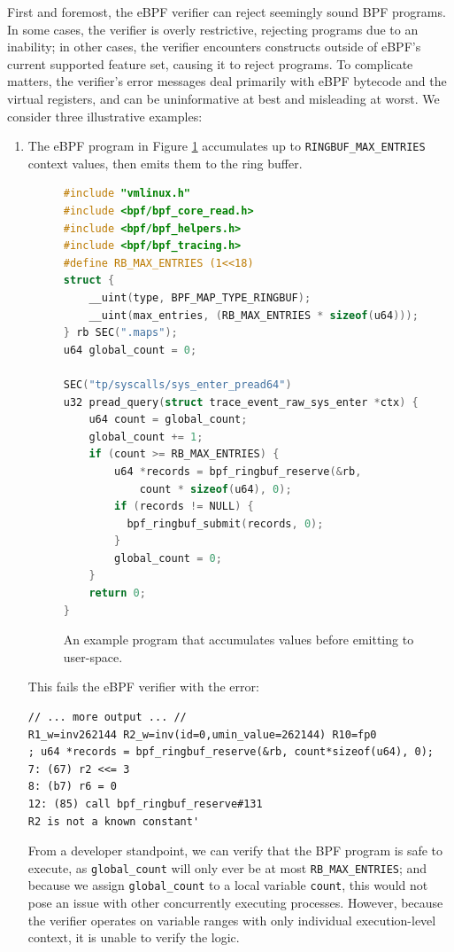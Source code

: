 First and foremost, the eBPF verifier can reject seemingly sound BPF programs. In some cases, the
verifier is overly restrictive, rejecting programs due to an inability; in other cases, the verifier
encounters constructs outside of eBPF's current supported feature set, causing it to reject
programs. To complicate matters, the verifier's error messages deal primarily with eBPF bytecode and
the virtual registers, and can be uninformative at best and misleading at worst. We consider three
illustrative examples:

\begin{enumerate}
    \item The eBPF program in Figure \ref{code:fail-1} accumulates up to
        \texttt{RINGBUF\_MAX\_ENTRIES} context values, then emits them to the ring buffer.
\begin{figure}[htpb]
\begin{lstlisting}[language=C]
#include "vmlinux.h"
#include <bpf/bpf_core_read.h>
#include <bpf/bpf_helpers.h>
#include <bpf/bpf_tracing.h>
#define RB_MAX_ENTRIES (1<<18)
struct {
    __uint(type, BPF_MAP_TYPE_RINGBUF);
    __uint(max_entries, (RB_MAX_ENTRIES * sizeof(u64)));
} rb SEC(".maps");
u64 global_count = 0;

SEC("tp/syscalls/sys_enter_pread64")
u32 pread_query(struct trace_event_raw_sys_enter *ctx) {
    u64 count = global_count;
    global_count += 1;
    if (count >= RB_MAX_ENTRIES) {
        u64 *records = bpf_ringbuf_reserve(&rb,
            count * sizeof(u64), 0);
        if (records != NULL) {
          bpf_ringbuf_submit(records, 0);
        }
        global_count = 0;
    }
    return 0;
}
\end{lstlisting}
\caption{An example program that accumulates values before emitting to user-space.}
\label{code:fail-1}
\end{figure}

    This fails the eBPF verifier with the error: 
\begin{lstlisting}
// ... more output ... //
R1_w=inv262144 R2_w=inv(id=0,umin_value=262144) R10=fp0
; u64 *records = bpf_ringbuf_reserve(&rb, count*sizeof(u64), 0);
7: (67) r2 <<= 3
8: (b7) r6 = 0
12: (85) call bpf_ringbuf_reserve#131
R2 is not a known constant'
\end{lstlisting}
    From a developer standpoint, we can verify that the BPF program is safe to execute, as
    \texttt{global\_count} will only ever be at most \texttt{RB\_MAX\_ENTRIES}; and because we
    assign \texttt{global\_count} to a local variable \texttt{count}, this would not pose an issue
    with other concurrently executing processes. However, because the verifier operates on variable
    ranges with only individual execution-level context, it is unable to verify the logic.


\end{enumerate}
